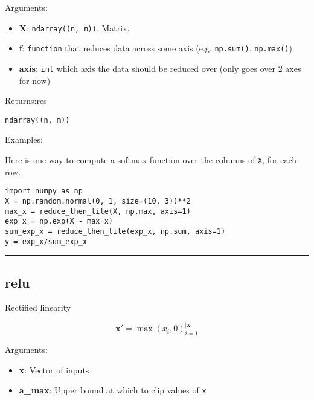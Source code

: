 Arguments:

\begin{itemize}
\tightlist
\item
  \textbf{X}: \texttt{ndarray((n,\ m))}. Matrix.
\item
  \textbf{f}: \texttt{function} that reduces data across some axis (e.g.
  \texttt{np.sum()}, \texttt{np.max()})
\item
  \textbf{axis}: \texttt{int} which axis the data should be reduced over
  (only goes over 2 axes for now)
\end{itemize}

Returns:res

\texttt{ndarray((n,\ m))}

Examples:

Here is one way to compute a softmax function over the columns of
\texttt{X}, for each row.

\begin{verbatim}
import numpy as np
X = np.random.normal(0, 1, size=(10, 3))**2
max_x = reduce_then_tile(X, np.max, axis=1)
exp_x = np.exp(X - max_x)
sum_exp_x = reduce_then_tile(exp_x, np.sum, axis=1)
y = exp_x/sum_exp_x
\end{verbatim}

\begin{center}\rule{0.5\linewidth}{\linethickness}\end{center}

\subsection{relu}\label{relu}

\begin{Shaded}
\begin{Highlighting}[]
\OperatorTok{=}\NormalTok{)}
\end{Highlighting}
\end{Shaded}

Rectified linearity

\[
\mathbf x' = \max (x_i, 0)_{i=1}^{|\mathbf x|}
\]

Arguments:

\begin{itemize}
\tightlist
\item
  \textbf{x}: Vector of inputs
\item
  \textbf{a\_max}: Upper bound at which to clip values of \texttt{x}
\end{itemize}

